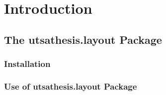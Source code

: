 \chapter{Introduction}






\section{The utsathesis.layout Package}




\subsection{Installation}




\subsection{Use of utsathesis.layout Package}

